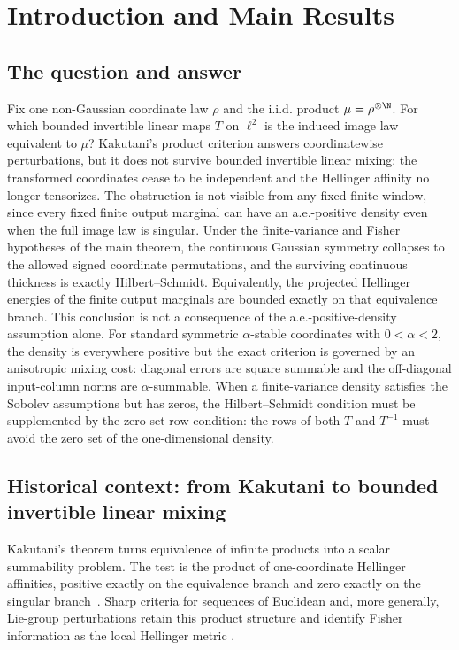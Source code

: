 \section{Introduction and Main Results}
\label{sec:introduction-and-main-results}

\subsection{The question and answer}
\label{sec:question-answer}

Fix one non-Gaussian coordinate law \(\rho\) and the i.i.d. product
\(\mu=\rho^{\otimes\N}\).
For which bounded invertible linear maps \(T\) on \(\ell^2\) is the
induced image law equivalent to \(\mu\)?
Kakutani's product criterion answers coordinatewise perturbations, but it
does not survive bounded invertible linear mixing: the transformed coordinates cease to be
independent and the Hellinger affinity no longer tensorizes.
The obstruction is not visible from any fixed finite window, since every
fixed finite output marginal can have an a.e.-positive density even when
the full image law is singular.
Under the finite-variance and Fisher hypotheses of the main theorem, the
continuous Gaussian symmetry collapses to the allowed signed coordinate
permutations, and the surviving continuous thickness is exactly
Hilbert--Schmidt.
Equivalently, the projected Hellinger energies of the finite output
marginals are bounded exactly on that equivalence branch.
This conclusion is not a consequence of the a.e.-positive-density assumption alone.
For standard symmetric \(\alpha\)-stable coordinates with
\(0<\alpha<2\), the density is everywhere positive but the exact criterion
is governed by an anisotropic mixing cost: diagonal errors are square summable and
the off-diagonal input-column norms are \(\alpha\)-summable.
When a finite-variance density satisfies the Sobolev assumptions but has
zeros, the Hilbert--Schmidt condition must be supplemented by the zero-set
row condition: the rows of both \(T\) and \(T^{-1}\) must avoid the zero set of the
one-dimensional density.

\subsection{Historical context: from Kakutani to bounded invertible linear mixing}
\label{sec:history}

Kakutani's theorem turns equivalence of infinite products into a scalar
summability problem.
The test is the product of one-coordinate Hellinger affinities, positive
exactly on the equivalence branch and zero exactly on the singular
branch~\cite{kakutani1948equivalence}.
Sharp criteria for sequences of Euclidean and, more generally, Lie-group
perturbations retain this product structure and identify Fisher information
as the local Hellinger metric
\cite{steele1986fisher,marques1992quasi}.

